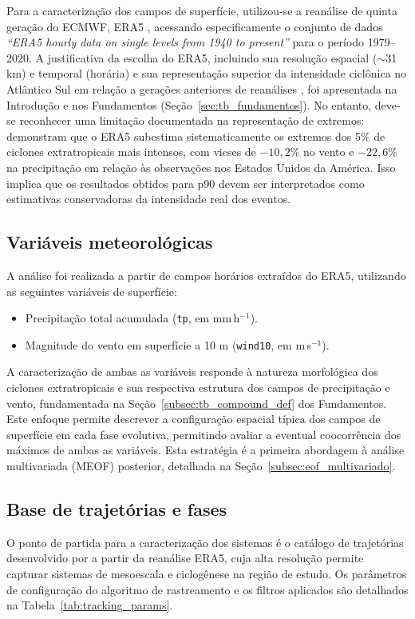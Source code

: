Para a caracterização dos campos de superfície, utilizou-se a reanálise de quinta geração do ECMWF, ERA5 \citep{hersbach2020era5}, acessando especificamente o conjunto de dados \textit{``ERA5 hourly data on single levels from 1940 to present''} \citep{hersbach_era5_2023b} para o período 1979--2020.
A justificativa da escolha do ERA5, incluindo sua resolução espacial ($\sim$31 km) e temporal (horária) e sua representação superior da intensidade ciclônica no Atlântico Sul em relação a gerações anteriores de reanálises \citep{gramcianinov2020analysis}, foi apresentada na Introdução e nos Fundamentos (Seção~\ref{sec:tb_fundamentos}).
No entanto, deve-se reconhecer uma limitação documentada na representação de extremos: \citet{chen2024evaluation} demonstram que o ERA5 subestima sistematicamente os extremos dos 5\% de ciclones extratropicais mais intensos, com vieses de $-10{,}2\%$ no vento e $-22{,}6\%$ na precipitação em relação às observações nos Estados Unidos da América.
Isso implica que os resultados obtidos para p90 devem ser interpretados como estimativas conservadoras da intensidade real dos eventos.

\subsection{Variáveis meteorológicas}\label{subsec:variables}

A análise foi realizada a partir de campos horários extraídos do ERA5, utilizando as seguintes variáveis de superfície:

\begin{itemize}
    \item Precipitação total acumulada (\texttt{tp}, em mm\,h$^{-1}$).
    \item Magnitude do vento em superfície a 10 m (\texttt{wind10}, em m\,s$^{-1}$).
\end{itemize}

A caracterização de ambas as variáveis responde à natureza morfológica dos ciclones extratropicais e sua respectiva estrutura dos campos de precipitação e vento, fundamentada na Seção~\ref{subsec:tb_compound_def} dos Fundamentos.
Este enfoque permite descrever a configuração espacial típica dos campos de superfície em cada fase evolutiva, permitindo avaliar a eventual coocorrência dos máximos de ambas as variáveis.
Esta estratégia é a primeira abordagem à análise multivariada (MEOF) posterior, detalhada na Seção~\ref{subsec:eof_multivariado}.

\subsection{Base de trajetórias e fases}\label{sec:bd_ciclones}
O ponto de partida para a caracterização dos sistemas é o catálogo de trajetórias desenvolvido por \citet{gramcianinov2019properties} a partir da reanálise ERA5, cuja alta resolução permite capturar sistemas de mesoescala e ciclogênese na região de estudo.
Os parâmetros de configuração do algoritmo de rastreamento e os filtros aplicados são detalhados na Tabela~\ref{tab:tracking_params}.

